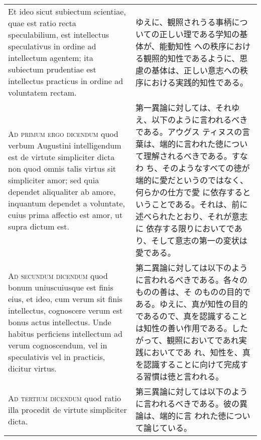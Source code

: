 \documentclass[10pt]{jsarticle}
\begin{document}
\begin{longtable}{p{21em}p{21em}}
\\


Et ideo sicut subiectum scientiae, quae est ratio recta speculabilium,
est intellectus speculativus in ordine ad intellectum agentem; ita
subiectum prudentiae est intellectus practicus in ordine ad voluntatem
rectam.


&

ゆえに、観照されうる事柄についての正しい理である学知の基体が、能動知性
への秩序における観照的知性であるように、思慮の基体は、正しい意志への秩
序における実践的知性である。

\\



{\scshape Ad primum ergo dicendum} quod verbum Augustini intelligendum
est de virtute simpliciter dicta non quod omnis talis virtus sit
simpliciter amor; sed quia dependet aliqualiter ab amore, inquantum
dependet a voluntate, cuius prima affectio est amor, ut supra dictum
est.


&

第一異論に対しては、それゆえ、以下のように言われるべきである。アウグス
ティヌスの言葉は、端的に言われた徳について理解されるべきである。すなわ
ち、そのようなすべての徳が端的に愛だというのではなく、何らかの仕方で愛
に依存するということである。それは、前に述べられたとおり、それが意志に
依存する限りにおいてであり、そして意志の第一の変状は愛である。

\\



{\scshape Ad secundum dicendum} quod bonum uniuscuiusque est finis
eius, et ideo, cum verum sit finis intellectus, cognoscere verum est
bonus actus intellectus. Unde habitus perficiens intellectum ad verum
cognoscendum, vel in speculativis vel in practicis, dicitur virtus.


&

第二異論に対しては以下のように言われるべきである。各々のものの善は、そ
のものの目的である。ゆえに、真が知性の目的であるので、真を認識すること
は知性の善い作用である。したがって、観照においてであれ実践においてであ
れ、知性を、真を認識することに向けて完成する習慣は徳と言われる。

\\



{\scshape Ad tertium dicendum} quod ratio illa procedit de virtute
simpliciter dicta.

&

第三異論に対しては以下のように言われるべきである。彼の異論は、端的に言
われた徳について論じている。

\end{longtable}
\newpage
\end{document}

